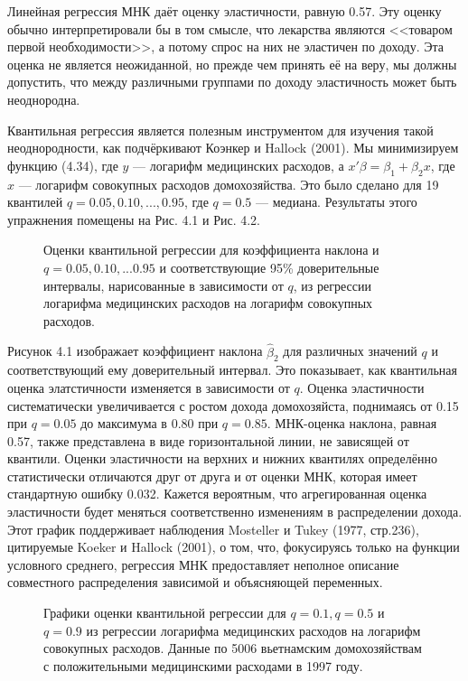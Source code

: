 Линейная регрессия МНК даёт оценку эластичности, равную 0.57. Эту оценку обычно интерпретировали бы в том смысле, что лекарства являются <<товаром первой необходимости>>, а потому спрос на них не эластичен по доходу. Эта оценка не является неожиданной, но прежде чем принять её на веру, мы должны допустить, что между различными группами по доходу эластичность может быть неоднородна.

Квантильная регрессия является полезным инструментом для изучения такой неоднородности, как подчёркивают Коэнкер и Hallock (2001). Мы минимизируем функцию (4.34), где $y$ --- логарифм медицинских расходов, а $x'\beta = \beta_1 +\beta_2 x$, где $x$ --- логарифм совокупных расходов домохозяйства. Это было сделано для 19 квантилей $q = {0.05, 0.10,..., 0.95}$, где $q = 0.5$ --- медиана. Результаты этого упражнения помещены на Рис. 4.1 и Рис. 4.2. 
\begin{figure}[t]
 \caption{Оценки квантильной регрессии для коэффициента наклона и $q = 0.05,0.10,...0.95$ и соответствующие 95\% доверительные интервалы, нарисованные в зависимости от $q$, из регрессии логарифма медицинских расходов на логарифм совокупных расходов.}
\end{figure}
Рисунок 4.1 изображает коэффициент наклона $\hat{\beta}_2$ для различных значений $q$ и соответствующий ему доверительный интервал. Это показывает, как квантильная оценка элатстичности изменяется в зависимости от $q$. Оценка эластичности систематически увеличивается с ростом дохода домохозяйста, поднимаясь от 0.15 при $q=0.05$ до максимума в $0.80$ при $q=0.85$. МНК-оценка наклона, равная 0.57, также представлена в виде горизонтальной линии, не зависящей от квантили. Оценки эластичности на верхних и нижних квантилях определённо статистически отличаются друг от друга и от оценки МНК, которая имеет стандартную ошибку 0.032. Кажется вероятным, что агрегированная оценка эластичности будет меняться соответственно изменениям в распределении дохода. Этот график поддерживает наблюдения Mosteller и Tukey (1977, стр.236), цитируемые Koeker и Hallock (2001), о том, что, фокусируясь только на функции условного среднего, регрессия МНК предоставляет неполное описание совместного распределения зависимой и объясняющей переменных.

\begin{figure}[t]
 \caption{Графики оценки квантильной регрессии для $q=0.1, q=0.5$ и $q=0.9$ из регрессии логарифма медицинских расходов на логарифм совокупных расходов. Данные по 5006 вьетнамским домохозяйствам с положительными медицинскими расходами в 1997 году.}
\end{figure}

